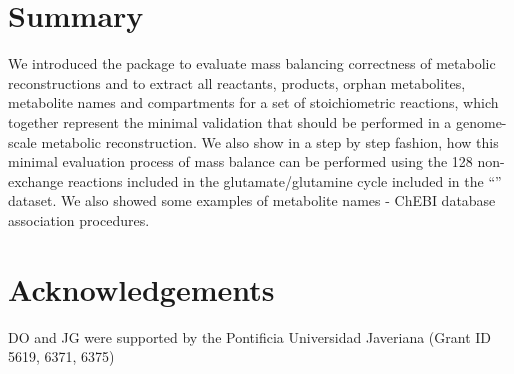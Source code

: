 \section{Summary}
We introduced the  package to evaluate mass balancing correctness of metabolic reconstructions and to extract all reactants, products, orphan metabolites, metabolite names and compartments for a set of stoichiometric reactions, which together represent the minimal validation that should be performed in a genome-scale metabolic reconstruction. We also show in a step by step fashion, how this minimal evaluation process of mass balance can be performed using the 128 non-exchange reactions included in the glutamate/glutamine cycle included in the ``'' dataset. We also showed some examples of metabolite names - ChEBI database association procedures.

\section{Acknowledgements}
DO and JG  were supported by the Pontificia Universidad Javeriana (Grant ID 5619, 6371, 6375) 


\address{Daniel Osorio\\
  Grupo de Investigación en Bioinformática y Biología de Sistemas\\ 
  Instituto de Genética, Universidad Nacional de Colombia\\
  Bogotá\\
  Colombia\\}

\address{Janneth Gonzalez\\
  Grupo de Investigación en Bioquímica Experimental y Computacional\\
  Facultad de Ciencias, Pontificia Universidad Javeriana\\
  Bogotá\\
  Colombia\\}

\address{Andres Pinzon-Velasco\\
  Grupo de Investigación en Bioinformática y Biología de Sistemas\\ 
  Instituto de Genética, Universidad Nacional de Colombia\\
  Bogotá\\
  Colombia\\}
